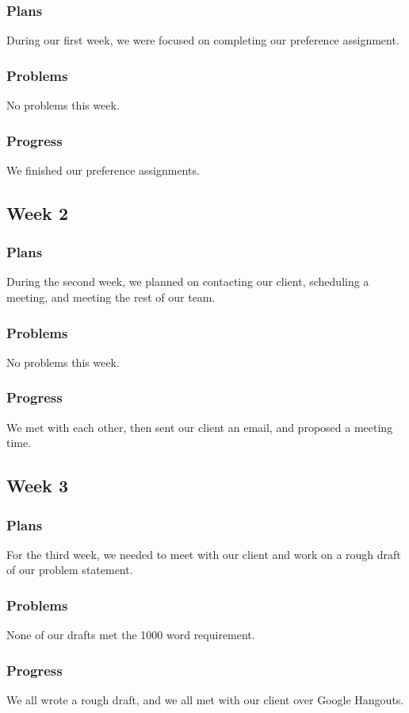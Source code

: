 \documentclass[onecolumn, draftclsnofoot, 10pt, compsoc]{IEEEtran}
\begin{document}
\subsubsection{Plans}
During our first week, we were focused on completing our preference assignment.
\subsubsection{Problems}
No problems this week.
\subsubsection{Progress}
We finished our preference assignments.


\subsection{Week 2}
\subsubsection{Plans}
During the second week, we planned on contacting our client, scheduling a meeting, and meeting the rest of our team.
\subsubsection{Problems}
No problems this week.
\subsubsection{Progress}
We met with each other, then sent our client an email, and proposed a meeting time.

\subsection{Week 3}
\subsubsection{Plans}
For the third week, we needed to meet with our client and work on a rough draft of our problem statement.
\subsubsection{Problems}
None of our drafts met the 1000 word requirement.
\subsubsection{Progress}
We all wrote a rough draft, and we all met with our client over Google Hangouts.
\end{document}
